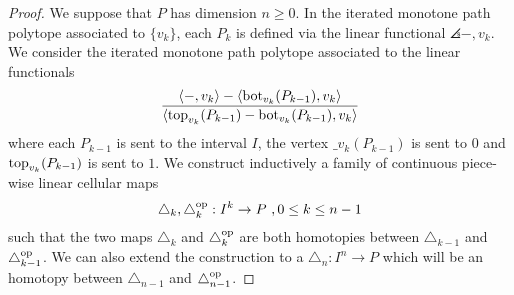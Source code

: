 \begin{proof}
	We suppose that $P$ has dimension $n\geq 0$. 
	In the iterated monotone path polytope associated to $\{v_k\}$, each $P_k$ is defined via the linear functional $\angles{-,v_k}$.
	We consider the iterated monotone path polytope associated to the linear functionals
	\begin{equation} \label{eq:new-projection}
		\frac{\langle-,v_k\rangle-\langle\operatorname{bot}_{v_k}(P_{k-1}),v_k\rangle}{\langle\operatorname{top}_{v_k}(P_{k-1})-\operatorname{bot}_{v_k}(P_{k-1}),v_k\rangle}
	\end{equation}
	where each $P_{k-1}$ is sent to the interval $I$, the vertex $\bm_{v_k}(P_{k-1})$ is sent to $0$ and $\operatorname{top}_{v_k}(P_{k-1})$ is sent to $1$.
	We construct inductively a family of continuous piece-wise linear cellular maps
	\[
	\triangle_k, \triangle_k^{\mathrm{op}}: I^k \to P \ , 0 \leq k \leq n-1
	\]
	such that the two maps $\triangle_k$ and $\triangle_k^{\mathrm{op}}$ are both homotopies between $\triangle_{k-1}$ and $\triangle_{k-1}^{\mathrm{op}}$.
	We can also extend the construction to a $\triangle_n : I^n \to P$ which will be an homotopy between $\triangle_{n-1}$ and $\triangle_{n-1}^{\mathrm{op}}$.


\end{proof}
